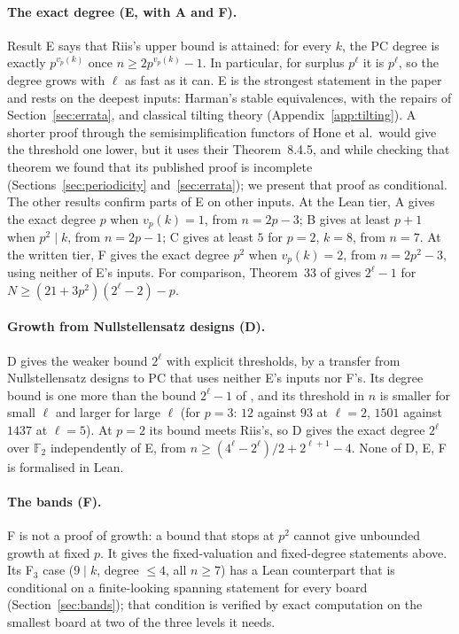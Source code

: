 \paragraph{The exact degree (E, with A and F).}  Result E says that Riis's upper bound is
attained: for every $k$, the PC degree is exactly $p^{v_p(k)}$ once $n\ge2p^{v_p(k)}-1$.  In
particular, for surplus $p^\ell$ it is $p^\ell$, so the degree grows with $\ell$ as fast as
it can.  E is the strongest statement in the paper and rests on the deepest inputs: Harman's
stable equivalences, with the repairs of Section~\ref{sec:errata}, and classical tilting
theory (Appendix~\ref{app:tilting}).  A shorter proof through the semisimplification
functors of Hone et al.\ would give the threshold one lower, but it uses their
Theorem~8.4.5, and while checking that theorem we found that its published proof is
incomplete (Sections~\ref{sec:periodicity} and~\ref{sec:errata}); we present that proof as
conditional.  The other results confirm parts of E on other inputs.  At the Lean tier,
A gives the exact degree $p$ when $v_p(k)=1$, from $n=2p-3$; B gives at least $p+1$ when
$p^2\mid k$, from $n=2p-1$; C gives at least $5$ for $p=2$, $k=8$, from $n=7$.  At the
written tier, F gives the exact degree $p^2$ when $v_p(k)=2$, from $n=2p^2-3$, using neither
of E's inputs.  For comparison, Theorem~33 of \cite{riis1997nonconstant} gives
$2^\ell-1$ for $N\ge(21+3p^2)(2^\ell-2)-p$.

\paragraph{Growth from Nullstellensatz designs (D).}  D gives the weaker bound $2^\ell$ with
explicit thresholds, by a transfer from Nullstellensatz designs to PC that uses neither E's
inputs nor F's.  Its degree bound is one more than the bound $2^\ell-1$ of
\cite[Thm.~33]{riis1997nonconstant}, and its threshold in $n$ is smaller for small $\ell$ and
larger for large $\ell$ (for $p=3$: $12$ against $93$ at $\ell=2$, $1501$ against $1437$ at
$\ell=5$).  At $p=2$ its bound meets Riis's, so D gives the exact degree $2^\ell$ over
$\mathbb F_2$ independently of E, from $n\ge(4^\ell-2^\ell)/2+2^{\ell+1}-4$.  None of D, E, F
is formalised in Lean.

\paragraph{The bands (F).}  F is not a proof of growth: a bound that stops at $p^2$
cannot give unbounded growth at fixed $p$.  It gives the fixed-valuation and fixed-degree
statements above.  Its F$_3$ case ($9\mid k$, degree $\le4$, all $n\ge7$) has a Lean
counterpart that is conditional on a finite-looking spanning statement for every board
(Section~\ref{sec:bands}); that condition is verified by exact computation on the smallest
board at two of the three levels it needs.

